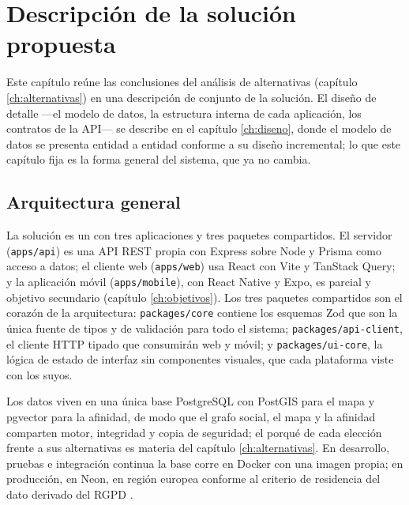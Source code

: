 
\chapter{Descripción de la solución propuesta}
\label{ch:solucion}

Este capítulo reúne las conclusiones del análisis de alternativas (capítulo \ref{ch:alternativas}) en una descripción de conjunto de la solución.
El diseño de detalle —el modelo de datos, la estructura interna de cada aplicación, los contratos de la \ac{API}— se describe en el capítulo \ref{ch:diseno}, donde el modelo de datos se presenta entidad a entidad conforme a su diseño incremental; lo que este capítulo fija es la forma general del sistema, que ya no cambia.

\section{Arquitectura general}
\label{sec:solucion-arquitectura}

La solución es un  con tres aplicaciones y tres paquetes compartidos.
El servidor (\texttt{apps/api}) es una \ac{API} \ac{REST} propia con Express sobre Node y Prisma como acceso a datos; el cliente web (\texttt{apps/web}) usa React con Vite y TanStack Query; y la aplicación móvil (\texttt{apps/mobile}), con React Native y Expo, es parcial y objetivo secundario (capítulo \ref{ch:objetivos}).
Los tres paquetes compartidos son el corazón de la arquitectura: \texttt{packages/core} contiene los esquemas Zod que son la única fuente de tipos y de validación para todo el sistema; \texttt{packages/api-client}, el cliente \ac{HTTP} tipado que consumirán web y móvil; y \texttt{packages/ui-core}, la lógica de estado de interfaz sin componentes visuales, que cada plataforma viste con los suyos.

Los datos viven en una única base PostgreSQL con PostGIS para el mapa y pgvector para la afinidad, de modo que el grafo social, el mapa y la afinidad comparten motor, integridad y copia de seguridad; el porqué de cada elección frente a sus alternativas es materia del capítulo \ref{ch:alternativas}.
En desarrollo, pruebas e integración continua la base corre en Docker con una imagen propia; en producción, en Neon, en región europea conforme al criterio de residencia del dato derivado del \ac{RGPD} \parencite{rgpd-2016-679}.

